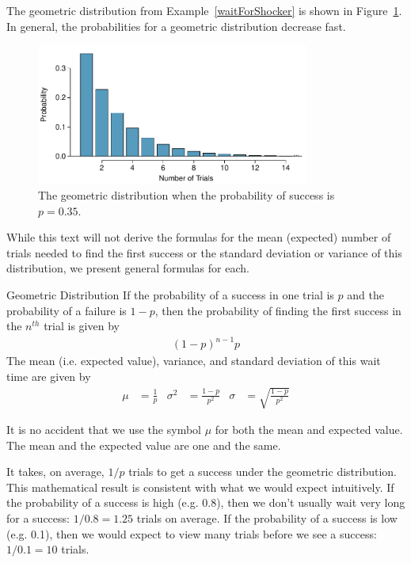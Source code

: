 The geometric distribution from Example~\ref{waitForShocker} is shown in Figure~\ref{geometricDist35}. In general, the probabilities for a geometric distribution decrease  fast.

\begin{figure}
\centering
\includegraphics[width=0.8\textwidth]{ch_distributions/figures/geometricDist35/geometricDist35}
\caption{The geometric distribution when the probability of success is $p=0.35$.}
\label{geometricDist35}
\end{figure}

While this text will not derive the formulas for the mean (expected) number of trials needed to find the first success or the standard deviation or variance of this distribution, we present general formulas for each.

\begin{onebox}{Geometric Distribution}
  If the probability of a success in one trial is $p$
  and the probability of a failure is $1-p$, then the
  probability of finding the first success in the
  $n^{th}$ trial is given by\vspace{-1.5mm}
  \begin{align*}
  (1-p)^{n-1}p
  \end{align*}
  The mean (i.e. expected value), variance,
  and standard deviation of this wait time are given by
  \begin{align*}
  \mu &= \frac{1}{p}
      &\sigma^2 &=\frac{1-p}{p^2}
      &\sigma &= \sqrt{\frac{1-p}{p^2}}
  \end{align*}
\end{onebox}

It is no accident that we use the symbol $\mu$ for both the mean and expected value. The mean and the expected value are one and the same.

It takes, on average, $1/p$ trials to get a success under the geometric distribution. This mathematical result is consistent with what we would expect intuitively. If the probability of a success is high (e.g. 0.8), then we don't usually wait very long for a success: $1/0.8 = 1.25$ trials on average. If the probability of a success is low (e.g. 0.1), then we would expect to view many trials before we see a success: $1/0.1 = 10$ trials.

